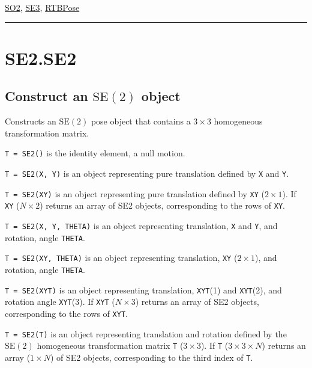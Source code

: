\hyperlink{SO2}{\color{blue} SO2}, \hyperlink{SE3}{\color{blue} SE3}, \hyperlink{RTBPose}{\color{blue} RTBPose}

\vspace{1.5ex}\hrule

\hypertarget{SE2.SE2}{\section*{SE2.SE2}}
\subsection*{Construct an $\mbox{SE}(2)$ object}


Constructs an $\mbox{SE}(2)$ pose object that contains a $3 \times 3$ homogeneous transformation
matrix.



\texttt{T = SE2()} is the identity element, a null motion.



\texttt{T = SE2(X, Y)} is an object representing pure translation defined by \texttt{X} and \texttt{Y}.



\texttt{T = SE2(XY)} is an object representing pure translation defined by \texttt{XY}
($2 \times 1$). If \texttt{XY} ($N \times 2$) returns an array of SE2 objects, corresponding to
the rows of \texttt{XY}.



\texttt{T = SE2(X, Y, THETA)} is an object representing translation, \texttt{X} and \texttt{Y}, and
rotation, angle \texttt{THETA}.



\texttt{T = SE2(XY, THETA)} is an object representing translation, \texttt{XY} ($2 \times 1$), and
rotation, angle \texttt{THETA}.



\texttt{T = SE2(XYT)} is an object representing translation, \texttt{XYT}(1) and \texttt{XYT}(2),
and rotation angle \texttt{XYT}(3). If \texttt{XYT} ($N \times 3$) returns an array of SE2 objects, corresponding to
the rows of \texttt{XYT}.



\texttt{T = SE2(T)} is an object representing translation and rotation defined by
the $\mbox{SE}(2)$ homogeneous transformation matrix \texttt{T} ($3 \times 3$).  If \texttt{T} ($3 \times 3 \times N$) returns an
array ($1 \times N$) of SE2 objects, corresponding to the third index of \texttt{T}.



